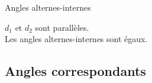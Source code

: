 \documentclass[12pt]{article}
\begin{document}
\begin{multicols}{2}
\begin{figure}[H]
  \end{figure}
\end{multicols}
\begin{multicols}{2}
  \begin{Definition}{Angles alternes-internes}\\
  \end{Definition}

  \begin{Proposition}{$d_1$ et $d_2$ sont parallèles.}\\
    Les angles alternes-internes sont égaux.
  \end{Proposition}
\end{multicols}
\subsection*{Angles correspondants}
\end{document}
